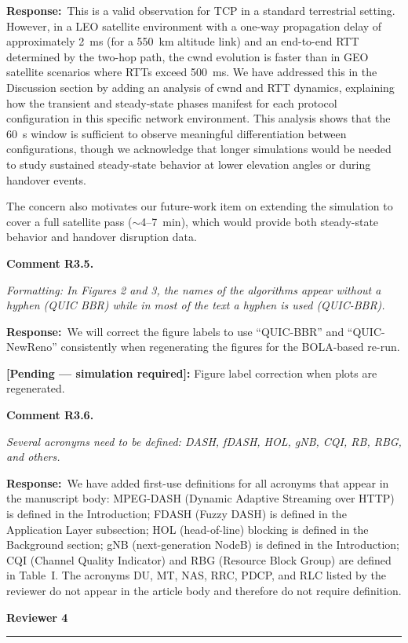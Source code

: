 \documentclass[11pt]{article}
\newcommand{\reviewer}[1]{\vspace{1em}\noindent\textbf{\large #1}\vspace{0.4em}\hrule\vspace{0.6em}}
\newcommand{\comment}[2]{\vspace{0.8em}\noindent\textbf{Comment #1.}\begin{reviewbox}\textit{#2}\end{reviewbox}}
\newcommand{\response}{\noindent\textbf{Response:}~}
\newcommand{\pending}[1]{\textcolor{red!70!black}{\textbf{[Pending — simulation required]:} #1}}
\begin{document}
\response This is a valid observation for TCP in a standard terrestrial setting. However, in a LEO satellite environment with a one-way propagation delay of approximately 2~ms (for a 550~km altitude link) and an end-to-end RTT determined by the two-hop path, the cwnd evolution is faster than in GEO satellite scenarios where RTTs exceed 500~ms. We have addressed this in the Discussion section by adding an analysis of cwnd and RTT dynamics, explaining how the transient and steady-state phases manifest for each protocol configuration in this specific network environment. This analysis shows that the 60~s window is sufficient to observe meaningful differentiation between configurations, though we acknowledge that longer simulations would be needed to study sustained steady-state behavior at lower elevation angles or during handover events.

The concern also motivates our future-work item on extending the simulation to cover a full satellite pass ($\sim$4--7~min), which would provide both steady-state behavior and handover disruption data.

\comment{R3.5}{Formatting: In Figures 2 and 3, the names of the algorithms appear without a hyphen (QUIC BBR) while in most of the text a hyphen is used (QUIC-BBR).}

\response We will correct the figure labels to use ``QUIC-BBR'' and ``QUIC-NewReno'' consistently when regenerating the figures for the BOLA-based re-run.

\pending{Figure label correction when plots are regenerated.}

\comment{R3.6}{Several acronyms need to be defined: DASH, fDASH, HOL, gNB, CQI, RB, RBG, and others.}

\response We have added first-use definitions for all acronyms that appear in the manuscript body: MPEG-DASH (Dynamic Adaptive Streaming over HTTP) is defined in the Introduction; FDASH (Fuzzy DASH) is defined in the Application Layer subsection; HOL (head-of-line) blocking is defined in the Background section; gNB (next-generation NodeB) is defined in the Introduction; CQI (Channel Quality Indicator) and RBG (Resource Block Group) are defined in Table~I. The acronyms DU, MT, NAS, RRC, PDCP, and RLC listed by the reviewer do not appear in the article body and therefore do not require definition.

\reviewer{Reviewer 4}
\end{document}
